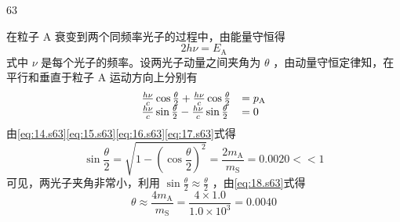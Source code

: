 \begin{solution}{63}
\begin{subsolution}
        在粒子 A 衰变到两个同频率光子的过程中，由能量守恒得
        \begin{equation}
            2 h \nu = E _ {\mathrm{A}}
            \label{eq:16.s63}
        \end{equation}
        式中 $\nu$ 是每个光子的频率。设两光子动量之间夹角为 $\theta$ ，由动量守恒定律知，在平行和垂直于粒子 A 运动方向上分别有
        \begin{equation}
            \begin{array}{l l}
                \frac {h \nu}{c} \cos \frac {\theta}{2} + \frac {h \nu}{c} \cos \frac {\theta}{2} & = p _ {\mathrm{A}} \\
                \frac {h \nu}{c} \sin \frac {\theta}{2} - \frac {h \nu}{c} \sin \frac {\theta}{2} & = 0
            \end{array}
            \label{eq:17.s63}
        \end{equation}
        由\eqref{eq:14.s63}\eqref{eq:15.s63}\eqref{eq:16.s63}\eqref{eq:17.s63}式得
        \begin{equation}
            \sin \frac {\theta}{2} = \sqrt {1 - \left(\cos \frac {\theta}{2}\right)^{2}} = \frac {2 m _ {\mathrm{A}}}{m _ {\mathrm{S}}} = 0.0020 << 1
            \label{eq:18.s63}
        \end{equation}
        可见，两光子夹角非常小，利用 $\sin \frac{\theta}{2} \approx \frac{\theta}{2}$ ，由\eqref{eq:18.s63}式得
        \begin{equation}
            \theta \approx \frac {4 m _ {\mathrm{A}}}{m _ {\mathrm{S}}} = \frac {4 \times 1.0}{1.0 \times 10^{3}} = 0.0040
            \label{eq:19.s63}
        \end{equation}
    \end{subsolution}
\end{solution}
